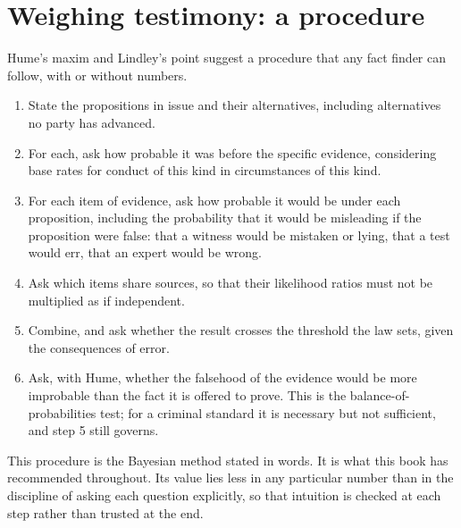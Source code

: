 \section{Weighing testimony: a procedure}

Hume's maxim and Lindley's point suggest a procedure that any fact finder can follow, with or without numbers.
\begin{enumerate}[label=\arabic*.]
\item State the propositions in issue and their alternatives, including alternatives no party has advanced.
\item For each, ask how probable it was before the specific evidence, considering base rates for conduct of this kind in circumstances of this kind.
\item For each item of evidence, ask how probable it would be under each proposition, including the probability that it would be misleading if the proposition were false: that a witness would be mistaken or lying, that a test would err, that an expert would be wrong.
\item Ask which items share sources, so that their likelihood ratios must not be multiplied as if independent.
\item Combine, and ask whether the result crosses the threshold the law sets, given the consequences of error.
\item Ask, with Hume, whether the falsehood of the evidence would be more improbable than the fact it is offered to prove. This is the balance-of-probabilities test; for a criminal standard it is necessary but not sufficient, and step 5 still governs.
\end{enumerate}
This procedure is the Bayesian method stated in words. It is what this book has recommended throughout. Its value lies less in any particular number than in the discipline of asking each question explicitly, so that intuition is checked at each step rather than trusted at the end.

